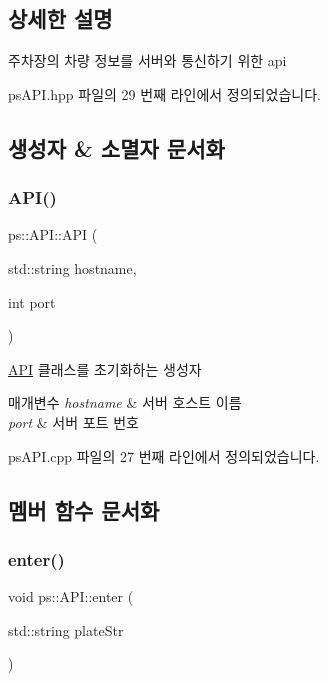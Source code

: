 \subsection{상세한 설명}
주차장의 차량 정보를 서버와 통신하기 위한 api 

ps\+A\+P\+I.\+hpp 파일의 29 번째 라인에서 정의되었습니다.



\subsection{생성자 \& 소멸자 문서화}
\mbox{\label{classps_1_1_a_p_i_aecd75588093e5e2dbb9b889ec2162b37}} 
\subsubsection{\texorpdfstring{A\+P\+I()}{API()}}
{\footnotesize\ttfamily ps\+::\+A\+P\+I\+::\+A\+PI (\begin{DoxyParamCaption}\item[{std\+::string}]{hostname,  }\item[{int}]{port }\end{DoxyParamCaption})}



\hyperlink{classps_1_1_a_p_i}{A\+PI} 클래스를 초기화하는 생성자 


\begin{DoxyParams}{매개변수}
{\em hostname} & 서버 호스트 이름 \\
\hline
{\em port} & 서버 포트 번호 \\
\hline
\end{DoxyParams}


ps\+A\+P\+I.\+cpp 파일의 27 번째 라인에서 정의되었습니다.



\subsection{멤버 함수 문서화}
\mbox{\label{classps_1_1_a_p_i_a4d7bcb7036c05867179a9a199862f192}} 
\subsubsection{\texorpdfstring{enter()}{enter()}}
{\footnotesize\ttfamily void ps\+::\+A\+P\+I\+::enter (\begin{DoxyParamCaption}\item[{std\+::string}]{plate\+Str }\end{DoxyParamCaption})}



